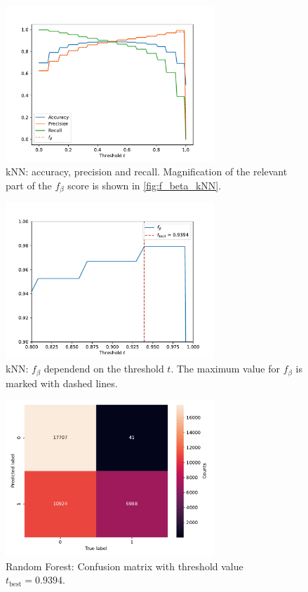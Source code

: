\begin{figure}
    \centering
    \includegraphics[width=0.7\textwidth]{content/plots/apr_kNN.pdf}
    \caption{kNN: accuracy, precision and recall. Magnification of the relevant part of the $f_{\beta}$ score is shown in \autoref{fig:f_beta_kNN}.}
    \label{fig:apr_kNN}
\end{figure}
\begin{figure}
    \centering
    \includegraphics[width=0.7\textwidth]{content/plots/f_beta_kNN.pdf}
    \caption{kNN: $f_{\beta}$ dependend on the threshold $t$. The maximum value for $f_{\beta}$ is marked with dashed lines.}
    \label{fig:f_beta_kNN}
\end{figure}
\begin{figure}
    \centering
    \includegraphics[width=0.7\textwidth]{content/plots/confusion_kNN.pdf}
    \caption{Random Forest: Confusion matrix with threshold value $t_{\mathrm{best}} = \num{0.9394}$.}
    \label{fig:confusion_kNN}
\end{figure}
